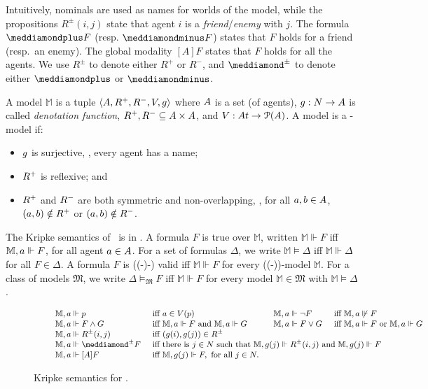  Intuitively, nominals are used as names for worlds of the model, while the propositions $R^\pm(i,j)$ state that agent $i$ is a  \emph{friend}/\emph{enemy} with
 $j$. 
The formula $\dplus F $ (resp. $\dminus F $) states that $F $ holds for  a friend (resp.\ an enemy). The global
modality $[A]F $ states that $F $ holds for all the agents. 
We use $R^\pm$ to denote either $R^+$ or $R^-$, and 
 $\dplusminus$ to denote either $\dplus$ or $\dminus$. 

A model $\mathbb{M}$ is a tuple $\langle \A,\R^+,\R^-,\V,\g\rangle$ where $\A$
is a set (of agents), $\g:N\rightarrow \A$ is called \emph{denotation
function}, $\R^+,\R^-\subseteq \A\times \A$, and $\V:\At\rightarrow
\mathcal{P}(\A)$. 
%
A model is a \PNL-model if:
\begin{itemize}
\item $\g$ is surjective, \ie, every agent has a name;
\item $\R^+$ is reflexive; and
\item $\R^+$ and $\R^-$ are both symmetric and 
non-overlapping, \ie,  for all $\ag,\b\in \A$, $(\ag,\b)\notin \R^+$ or $(\ag,\b)\notin \R^-$. 
\end{itemize}  
The Kripke semantics of \PNL~is in .
A formula $F$ is true over $\mathbb{M}$, written $\mathbb{M}\Vdash F$ iff
$\mathbb{M},\ag\Vdash F$, for all agent $\ag\in\A$. For a set of formulas
$\Delta$, we write $\mathbb{M}\models \Delta$ iff $\mathbb{M}\Vdash \Delta$ for all $F
\in \Delta$. A formula $F$ is ((\cc-)\PNL-) valid iff $\mathbb{M}\Vdash F$ for every
((\cc-)\PNL)-model $\mathbb{M}$. For a class of models $\mathfrak{M}$, we write
$\Delta\models_{\mathfrak{M}} F$ iff $\mathbb{M}\Vdash F$ for every model
$\mathbb{M}\in \mathfrak{M}$ with $\mathbb{M}\models \Delta$. 


\begin{figure}
$\small
\qquad\begin{array}{lll l lll}
    \mathbb{M},\ag \Vdash p &\text{ iff } \ag\in \V(p) &\quad& 
    \mathbb{M},\ag \Vdash \neg F &\text{ iff } \mathbb{M},\ag \not \Vdash F\\
    \mathbb{M},\ag \Vdash F \wedge G &\text{ iff } \mathbb{M},\ag \Vdash F \text{ and } \mathbb{M},\ag \Vdash G &\quad&
    \mathbb{M},\ag \Vdash F \vee G &\text{ iff } \mathbb{M},\ag \Vdash F \text{ or } \mathbb{M},\ag \Vdash G\\
    \mathbb{M},\ag \Vdash R^\pm(i,j) &\text{ iff } (\g(i),\g(j))\in \R^\pm\\
    \mathbb{M},\ag \Vdash \dplusminus F &\multicolumn{6}{l}{\text{ iff there is } j\in N \text{ such that } \mathbb{M},\g(j)\Vdash R^{\pm}(i,j)  \text{ and } \mathbb{M},\g(j)\Vdash  F }\\
    \mathbb{M},\ag \Vdash [A] F  &\multicolumn{6}{l}{\text{ iff } \mathbb{M},\g(j)\Vdash  F , \text{ for all } j\in N.}
\end{array}
$
\caption{Kripke semantics for \PNL\label{fig:ksem}.}
\end{figure}

